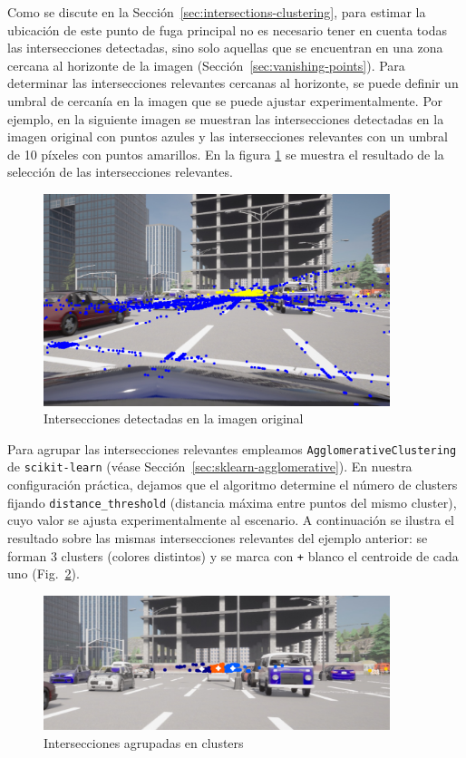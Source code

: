Como se discute en la Sección~\ref{sec:intersections-clustering}, para estimar la ubicación de este punto de fuga principal no es necesario tener en cuenta todas las intersecciones detectadas, sino solo aquellas que se encuentran en una zona cercana al horizonte de la imagen (Sección~\ref{sec:vanishing-points}).
Para determinar las intersecciones relevantes cercanas al horizonte, se puede definir un umbral de cercanía en la imagen que se puede ajustar experimentalmente.
Por ejemplo, en la siguiente imagen se muestran las intersecciones detectadas en la imagen original con puntos azules
y las intersecciones relevantes con un umbral de 10 píxeles con puntos amarillos.
En la figura \ref{fig:relevantInter} se muestra el resultado de la selección de las intersecciones relevantes. \\
\begin{figure}[!ht]
    \centering
    \includegraphics[width=0.9\textwidth]{img/reticule/relevantInter}
    \caption{Intersecciones detectadas en la imagen original}
    \label{fig:relevantInter}
\end{figure}


Para agrupar las intersecciones relevantes empleamos \texttt{AgglomerativeClustering} de \texttt{scikit-learn}
(véase Sección~\ref{sec:sklearn-agglomerative}). En nuestra configuración práctica,
dejamos que el algoritmo determine el número de clusters fijando \texttt{distance\_threshold} (distancia máxima entre puntos del mismo
cluster), cuyo valor se ajusta experimentalmente al escenario. A continuación se ilustra el resultado sobre las mismas
intersecciones relevantes del ejemplo anterior: se forman 3 clusters (colores distintos) y se marca con \texttt{+} blanco el centroide de cada uno
(Fig.~\ref{fig:clusters}).
\begin{figure}[!ht]
    \centering
    \includegraphics[width=0.9\textwidth]{img/reticule/AgglomerativeClustering}
    \caption{Intersecciones agrupadas en clusters}
    \label{fig:clusters}
\end{figure}



